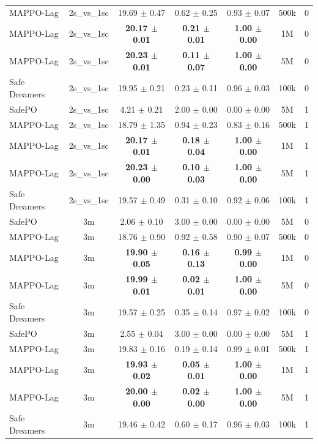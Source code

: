 \begin{longtable}{lcccccc}
MAPPO-Lag & 2s\_vs\_1sc & 19.69 $\pm$ 0.47 & 0.62 $\pm$ 0.25 & 0.93 $\pm$ 0.07 & 500k & 0 \\
MAPPO-Lag & 2s\_vs\_1sc & \textbf{20.17 $\pm$ 0.01} & \textbf{0.21 $\pm$ 0.01} & \textbf{1.00 $\pm$ 0.00} & 1M & 0 \\
MAPPO-Lag & 2s\_vs\_1sc & \textbf{20.23 $\pm$ 0.01} & \textbf{0.11 $\pm$ 0.07} & \textbf{1.00 $\pm$ 0.00} & 5M & 0 \\
Safe Dreamers & 2s\_vs\_1sc & 19.95 $\pm$ 0.21 & 0.23 $\pm$ 0.11 & 0.96 $\pm$ 0.03 & 100k & 0 \\
\midrule
SafePO & 2s\_vs\_1sc & 4.21 $\pm$ 0.21 & 2.00 $\pm$ 0.00 & 0.00 $\pm$ 0.00 & 5M & 1 \\
MAPPO-Lag & 2s\_vs\_1sc & 18.79 $\pm$ 1.35 & 0.94 $\pm$ 0.23 & 0.83 $\pm$ 0.16 & 500k & 1 \\
MAPPO-Lag & 2s\_vs\_1sc & \textbf{20.17 $\pm$ 0.01} & \textbf{0.18 $\pm$ 0.04} & \textbf{1.00 $\pm$ 0.00} & 1M & 1 \\
MAPPO-Lag & 2s\_vs\_1sc & \textbf{20.23 $\pm$ 0.00} & \textbf{0.10 $\pm$ 0.03} & \textbf{1.00 $\pm$ 0.00} & 5M & 1 \\
Safe Dreamers & 2s\_vs\_1sc & 19.57 $\pm$ 0.49 & 0.31 $\pm$ 0.10 & 0.92 $\pm$ 0.06 & 100k & 1 \\
\midrule
SafePO & 3m & 2.06 $\pm$ 0.10 & 3.00 $\pm$ 0.00 & 0.00 $\pm$ 0.00 & 5M & 0 \\
MAPPO-Lag & 3m & 18.76 $\pm$ 0.90 & 0.92 $\pm$ 0.58 & 0.90 $\pm$ 0.07 & 500k & 0 \\
MAPPO-Lag & 3m & \textbf{19.90 $\pm$ 0.05} & \textbf{0.16 $\pm$ 0.13} & \textbf{0.99 $\pm$ 0.00} & 1M & 0 \\
MAPPO-Lag & 3m & \textbf{19.99 $\pm$ 0.01} & \textbf{0.02 $\pm$ 0.01} & \textbf{1.00 $\pm$ 0.00} & 5M & 0 \\
Safe Dreamers & 3m & 19.57 $\pm$ 0.25 & 0.35 $\pm$ 0.14 & 0.97 $\pm$ 0.02 & 100k & 0 \\
\midrule
SafePO & 3m & 2.55 $\pm$ 0.04 & 3.00 $\pm$ 0.00 & 0.00 $\pm$ 0.00 & 5M & 1 \\
MAPPO-Lag & 3m & 19.83 $\pm$ 0.16 & 0.19 $\pm$ 0.14 & 0.99 $\pm$ 0.01 & 500k & 1 \\
MAPPO-Lag & 3m & \textbf{19.93 $\pm$ 0.02} & \textbf{0.05 $\pm$ 0.01} & \textbf{1.00 $\pm$ 0.00} & 1M & 1 \\
MAPPO-Lag & 3m & \textbf{20.00 $\pm$ 0.00} & \textbf{0.02 $\pm$ 0.00} & \textbf{1.00 $\pm$ 0.00} & 5M & 1 \\
Safe Dreamers & 3m & 19.46 $\pm$ 0.42 & 0.60 $\pm$ 0.17 & 0.96 $\pm$ 0.03 & 100k & 1 \\

\end{longtable}
